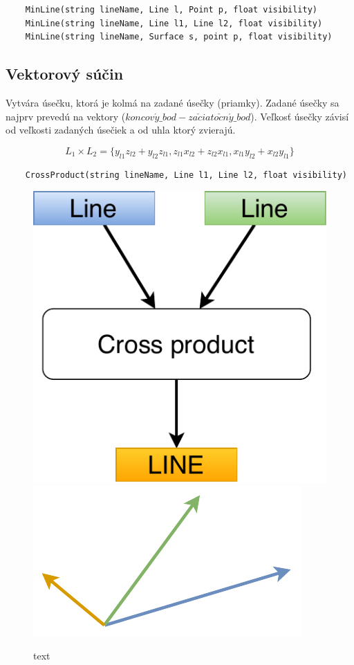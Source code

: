\begin{lstlisting}
	MinLine(string lineName, Line l, Point p, float visibility)
	MinLine(string lineName, Line l1, Line l2, float visibility)
	MinLine(string lineName, Surface s, point p, float visibility)
\end{lstlisting}




\subsection{Vektorový súčin}\label{subsec:crossproduct}
Vytvára úsečku, ktorá je kolmá na zadané úsečky (priamky). Zadané úsečky sa najprv prevedú na vektory ($koncov\acute{y}\_bod - za\check{c}iato\check{c}n\acute{y}\_bod$).
Veľkosť úsečky závisí od veľkosti zadaných úsečiek a od uhla ktorý zvierajú. 

\begin{equation}
 L_1 \times L_2 =  \{
 y_{l1} z_{l2} + y_{l2} z_{l1} ,
 z_{l1} x_{l2} + z_{l2} x_{l1} ,
 x_{l1} y_{l2} + x_{l2} y_{l1}\}
    \label{eq:cross}
\end{equation}


\begin{lstlisting}
	CrossProduct(string lineName, Line l1, Line l2, float visibility)
\end{lstlisting}

\begin{figure}[H]
	\centering
	\includegraphics[height=0.3\textwidth]{obrazky-figures/Diagram/Line/DP Navrh operacii-1D - LineCross.pdf}
	\includegraphics[height=0.3\textwidth]{obrazky-figures/Diagram/Draw/2Line/DP Navrh operacii-1D - LineCross.pdf}
	\caption{text}
	\label{fig:1}
\end{figure}

